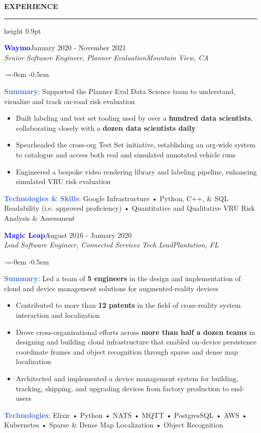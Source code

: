 \documentclass[
    11pt, %
]{resume} %
\newenvironment{rSectionCustom}[1]{
  \Large
  \sectionskip
  \textbf{\textcolor{Cerulean}{\MakeUppercase{#1}}}
  \vspace{0.5em}
  {\color{Blue}\hrule height 0.9pt}
  \vspace{0.25em}

  \begin{list}{}{
    \setlength{\leftmargin}{1.5em}
  }
  \item[]
}{
    \vspace{1em}
  \end{list}
}
\newenvironment{rSubsection2}[4]{
  \normalsize
  \hspace{-18pt}\textcolor{Blue}{\textbf{\large #1}}\hfill{#2}
  \\
  \hspace*{-18pt}\emph{#3}\hfill\emph{#4}
  \begin{list}{$\cdot$}{\leftmargin=-0em}
  \itemsep -0.5em \vspace{-0.25em}
}{
\vspace{1em}
  \end{list}
}
\begin{document}
\begin{rSectionCustom}{Experience}
    \begin{rSubsection2}{Waymo}{January 2020 - November 2021}{Senior Software Engineer, Planner Evaluation}{Mountain View, CA}
        \item[] \textcolor{RoyalBlue}{\textbf{Summary}}: Supported the Planner Eval Data Science team to understand, visualize and track on-road risk evaluation
        \begin{itemize}[leftmargin=*]
            \item Built labeling and test set tooling used by over a \textbf{hundred data scientists}, collaborating closely with a \textbf{dozen data scientists daily}
            \item Spearheaded the cross-org Test Set initiative, establishing an org-wide system to catalogue and access both real and simulated annotated vehicle runs
            \item Engineered a bespoke video rendering library and labeling pipeline, enhancing simulated VRU risk evaluation
        \end{itemize}
        \vspace{0.5em}
        \item[] \textcolor{RoyalBlue}{\textbf{Technologies \& Skills}}: Google Infrastructure • Python, C++, \& SQL Readability (i.e. approved proficiency) • Quantitative and Qualitative VRU Risk Analysis \& Assessment
    \end{rSubsection2}

    \begin{rSubsection2}{Magic Leap}{August 2016 - January 2020}{Lead Software Engineer, Connected Services Tech Lead}{Plantation, FL}
        \item[] \textcolor{RoyalBlue}{\textbf{Summary}}: Led a team of \textbf{5 engineers} in the design and implementation of cloud and device management solutions for augmented-reality devices
        \begin{itemize}[leftmargin=*]
            \item Contributed to more than \textbf{12 patents} in the field of cross-reality system interaction and localization
            \item Drove cross-organizational efforts across \textbf{more than half a dozen teams} in designing and building cloud infrastructure that enabled on-device persistence coordinate frames and object recognition through sparse and dense map localization
            \item Architected and implemented a device management system for building, tracking, shipping, and upgrading devices from factory production to end-users
            \end{itemize}
        \vspace{0.5em}
        \item[] \textcolor{RoyalBlue}{\textbf{Technologies}}: Elixir • Python • NATS • MQTT • PostgresSQL • AWS • Kubernetes • Sparse \& Dense Map Localization • Object Recognition
    \end{rSubsection2}


\end{rSectionCustom}
\end{document}
